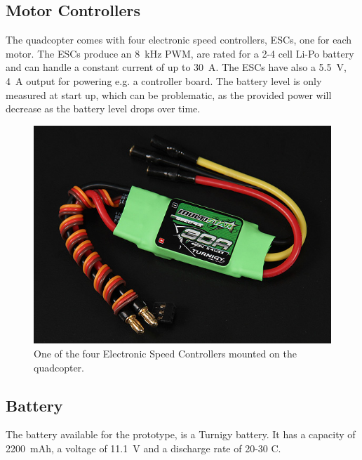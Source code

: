 
\subsection{Motor Controllers}\label{subsec:ESC}
The quadcopter comes with four electronic speed controllers, ESCs, one for each motor. The ESCs produce an \SI{8}{kHz} PWM, are rated for a 2-4 cell Li-Po battery and can handle a constant current of up to \SI{30}{A}. The ESCs have also a \SI{5.5}{V}, \SI{4}{A} output for powering e.g. a controller board. The battery level is only measured at start up, which can be problematic, as the provided power will decrease as the battery level drops over time. \cite{HKing}

%
\begin{figure}[H]
	\centering
	\includegraphics[scale=0.3]{figures/ESC}
	\caption{One of the four Electronic Speed Controllers mounted on the quadcopter.\cite{HKing}}
	\label{fig:esc}
\end{figure}
%
\subsection{Battery}
The battery available for the prototype, is a Turnigy battery. It has a capacity of \SI{2200}{mAh}, a voltage of \SI{11.1}{V} and a discharge rate of 20-30 C.\cite{HKingBattery}

